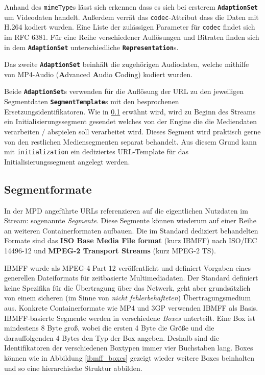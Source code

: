 \documentclass[paper = a4, fontsize = 12pt, parskip = half]{scrartcl} %
\def\attr#1{\texttt{#1}}
\def\elem#1{\texttt{\textbf{#1}}}
\begin{document}
Anhand des \attr{mimeType}s lässt sich erkennen dass es sich bei ersterem \elem{AdaptionSet} um Videodaten handelt. Außerdem verrät das \attr{codec}-Attribut dass die Daten mit H.264 kodiert wurden. Eine Liste der zulässigen Parameter für \attr{codec} findet sich im RFC 6381. Für eine Reihe verschiedener Auflösungen und Bitraten finden sich in dem \elem{AdaptionSet} unterschiedliche \elem{Representation}s.

Das zweite \elem{AdaptionSet} beinhält die zugehörigen Audiodaten, welche mithilfe von MP4-Audio (\textbf{A}dvanced \textbf{A}udio \textbf{C}oding) kodiert wurden.

Beide \elem{AdaptionSet}s verwenden für die Auflösung der URL zu den jeweiligen Segmentdaten \elem{SegmentTemplate}s mit den besprochenen Ersetzungsidentifikatoren. Wie in \ref{segment_formats} erwähnt wird, wird zu Beginn des Streams ein Initialisierungssegment gesendet welches von der Engine die die Mediendaten verarbeiten / abspielen soll verarbeitet wird. Dieses Segment wird praktisch gerne von den restlichen Mediensegmenten separat behandelt. Aus diesem Grund kann mit \attr{initialization} ein dediziertes URL-Template für das Initialisierungssegment angelegt werden.


\subsection{Segmentformate}
\label{segment_formats}
In der MPD angeführte URLs referenzieren auf die eigentlichen Nutzdaten im Stream: sogenannte \textit{Segmente}. Diese Segmente können wiederum auf einer Reihe an weiteren Containerformaten aufbauen. Die im Standard dediziert behandelten Formate sind das \textbf{ISO Base Media File format} (kurz IBMFF) nach ISO/IEC 14496-12 und \textbf{MPEG-2 Transport Streams} (kurz MPEG-2 TS).

IBMFF wurde als MPEG-4 Part 12 veröffentlicht und definiert Vorgaben eines generellen Dateiformats für zeitbasierte Multimediadaten. Der Standard definiert keine Spezifika für die Übertragung über das Netwerk, geht aber grundsätzlich von einem sicheren (im Sinne von \textit{nicht fehlerbehafteten}) Übertragungsmedium aus. Konkrete Containerformate wie MP4 und 3GP verwenden IBMFF als Basis. IBMFF-basierte Segmente werden in verschiedene \textit{Boxes} unterteilt. Eine Box ist mindestens 8 Byte groß, wobei die ersten 4 Byte die Größe und die darauffolgenden 4 Bytes den Typ der Box angeben. Deshalb sind die Identifikatoren der verschiedenen Boxtypen immer vier Buchstaben lang. Boxes können wie in Abbildung \ref{ibmff_boxes} gezeigt wieder weitere Boxes beinhalten und so eine hierarchische Struktur abbilden.
\end{document}
